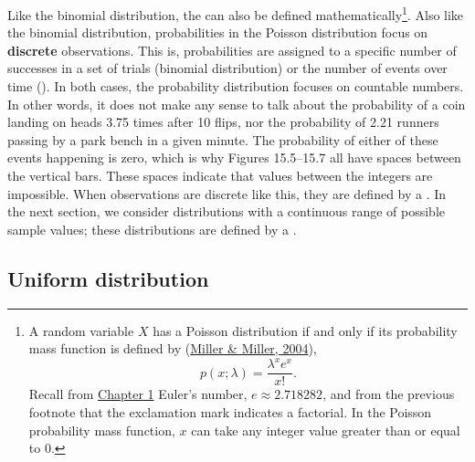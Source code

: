 \documentclass[
  openany]{krantz}
\begin{document}
Like the binomial distribution, the  can also be defined mathematically\footnote{A random variable \(X\) has a Poisson distribution if and only if its probability mass function is defined by (\protect\hyperlink{ref-Miller2004}{Miller \& Miller, 2004}), \[p \left(x; \lambda \right) = \frac{\lambda^{x}e^{x}}{x!}.\] Recall from \protect\hyperlink{Chapter_1}{Chapter 1} Euler's number, \(e \approx 2.718282\), and from the previous footnote that the exclamation mark indicates a factorial. In the Poisson probability mass function, \(x\) can take any integer value greater than or equal to 0.}.
Also like the binomial distribution, probabilities in the Poisson distribution focus on \textbf{discrete} observations.
This is, probabilities are assigned to a specific number of successes in a set of trials (binomial distribution) or the number of events over time ().
In both cases, the probability distribution focuses on countable numbers.
In other words, it does not make any sense to talk about the probability of a coin landing on heads 3.75 times after 10 flips, nor the probability of 2.21 runners passing by a park bench in a given minute.
The probability of either of these events happening is zero, which is why Figures 15.5--15.7 all have spaces between the vertical bars.
These spaces indicate that values between the integers are impossible.
When observations are discrete like this, they are defined by a \emph{}.
In the next section, we consider distributions with a continuous range of possible sample values; these distributions are defined by a \emph{}.

\hypertarget{uniform-distribution}{%
\subsection{Uniform distribution}\label{uniform-distribution}}
\end{document}
